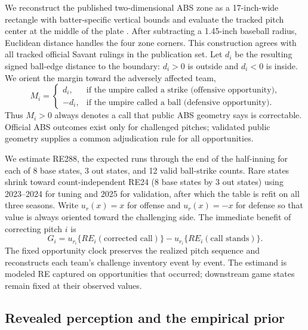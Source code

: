 \documentclass[12pt,letterpaper]{article}
\begin{document}
We reconstruct the published two-dimensional ABS zone as a 17-inch-wide
rectangle with batter-specific vertical bounds and evaluate the tracked pitch
center at the middle of the plate
\citep{mlb2025absrules,castrovince2026absrules}. After subtracting a
1.45-inch baseball radius, Euclidean distance handles the four zone corners.
This construction agrees with all \TrackedOfficialRulings{} tracked official Savant rulings in the
publication set. Let $d_i$ be the resulting signed ball-edge distance to the
boundary: $d_i>0$ is outside and $d_i<0$ is inside. We orient the margin toward
the adversely affected team,
\begin{equation}
  M_i=
  \begin{cases}
    d_i, & \text{if the umpire called a strike (offensive opportunity)},\\
    -d_i, & \text{if the umpire called a ball (defensive opportunity)}.
  \end{cases}
  \label{eq:role-margin}
\end{equation}
Thus $M_i>0$ always denotes a call that public ABS geometry says is
correctable. Official ABS outcomes exist only for challenged pitches;
validated public geometry supplies a common adjudication rule for all
opportunities.

We estimate RE288, the expected runs through the end of the half-inning for
each of 8 base states, 3 out states, and 12 valid ball-strike counts. Rare
states shrink toward count-independent RE24 (8 base states by 3 out states)
using 2023--2024 for tuning and 2025 for validation, after which the table is
refit on all three seasons. Write
$u_r(x)=x$ for offense and $u_r(x)=-x$ for defense so that value is always
oriented toward the challenging side. The immediate benefit of correcting
pitch $i$ is
\begin{equation}
  G_i=u_{r_i}\{RE_i(\text{corrected call})\}
      -u_{r_i}\{RE_i(\text{call stands})\}.
  \label{eq:gain}
\end{equation}
The fixed opportunity clock preserves the realized pitch sequence and
reconstructs each team's challenge inventory event by event. The estimand is
modeled RE captured on opportunities that occurred; downstream game states
remain fixed at their observed values.

\subsection{Revealed perception and the empirical prior}
\end{document}

